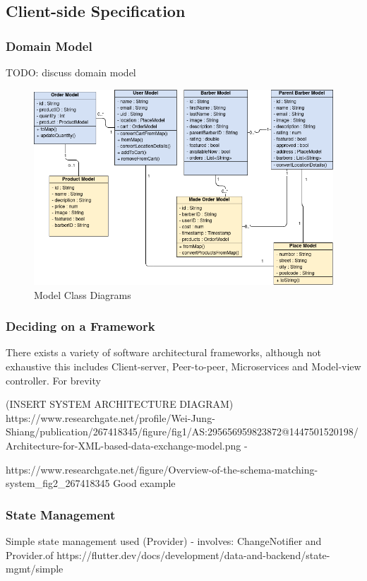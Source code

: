 \documentclass[12pt]{article}
\begin{document}
	

	
	\subsection{Client-side Specification}

	\subsubsection{Domain Model}
	TODO: discuss domain model
	
	\begin{figure}[H]
		\centering
		\includegraphics[scale=0.7]{images/model-class-diagrams.png}
		\caption{Model Class Diagrams}
		\label{fig:model-class-diagrams}
	\end{figure}
	
	\subsubsection{Deciding on a Framework}
	There exists a variety of software architectural frameworks, although not exhaustive this includes Client-server, Peer-to-peer, Microservices and Model-view controller. For brevity
	
	(INSERT SYSTEM ARCHITECTURE DIAGRAM)
	https://www.researchgate.net/profile/Wei-Jung-Shiang/publication/267418345/figure/fig1/AS:295656959823872@1447501520198/Architecture-for-XML-based-data-exchange-model.png - 
	
	https://www.researchgate.net/figure/Overview-of-the-schema-matching-system\_fig2\_267418345
	Good example
	
	\subsubsection{State Management}	
	Simple state management used (Provider) -
	involves: ChangeNotifier and Provider.of
	https://flutter.dev/docs/development/data-and-backend/state-mgmt/simple
	
\end{document}

